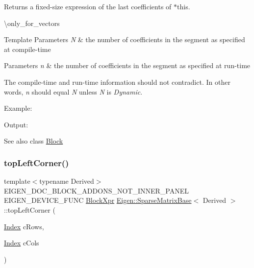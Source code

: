 \begin{DoxyReturn}{Returns}
a fixed-\/size expression of the last coefficients of $\ast$this.
\end{DoxyReturn}
\textbackslash{}only\+\_\+for\+\_\+vectors


\begin{DoxyTemplParams}{Template Parameters}
{\em N} & the number of coefficients in the segment as specified at compile-\/time \\
\hline
\end{DoxyTemplParams}

\begin{DoxyParams}{Parameters}
{\em n} & the number of coefficients in the segment as specified at run-\/time\\
\hline
\end{DoxyParams}
The compile-\/time and run-\/time information should not contradict. In other words, {\itshape n} should equal {\itshape N} unless {\itshape N} is {\itshape Dynamic}.

Example\+: 
\begin{DoxyCodeInclude}{0}
\end{DoxyCodeInclude}
 Output\+: 
\begin{DoxyVerbInclude}
\end{DoxyVerbInclude}


\begin{DoxySeeAlso}{See also}
class \mbox{\hyperlink{class_eigen_1_1_block}{Block}} 
\end{DoxySeeAlso}
\mbox{\label{class_eigen_1_1_sparse_matrix_base_a5e0cd43cb4555c7ef79fd0481d117cce}} 
\subsubsection{\texorpdfstring{topLeftCorner()}{topLeftCorner()}\hspace{0.1cm}{\footnotesize\ttfamily [1/3]}}
{\footnotesize\ttfamily template$<$typename Derived$>$ \\
E\+I\+G\+E\+N\+\_\+\+D\+O\+C\+\_\+\+B\+L\+O\+C\+K\+\_\+\+A\+D\+D\+O\+N\+S\+\_\+\+N\+O\+T\+\_\+\+I\+N\+N\+E\+R\+\_\+\+P\+A\+N\+EL E\+I\+G\+E\+N\+\_\+\+D\+E\+V\+I\+C\+E\+\_\+\+F\+U\+NC \mbox{\hyperlink{class_eigen_1_1_block}{Block\+Xpr}} \mbox{\hyperlink{class_eigen_1_1_sparse_matrix_base}{Eigen\+::\+Sparse\+Matrix\+Base}}$<$ Derived $>$\+::top\+Left\+Corner (\begin{DoxyParamCaption}\item[{\mbox{\hyperlink{struct_eigen_1_1_eigen_base_a554f30542cc2316add4b1ea0a492ff02}{Index}}}]{c\+Rows,  }\item[{\mbox{\hyperlink{struct_eigen_1_1_eigen_base_a554f30542cc2316add4b1ea0a492ff02}{Index}}}]{c\+Cols }\end{DoxyParamCaption})\hspace{0.3cm}{\ttfamily [inline]}}

